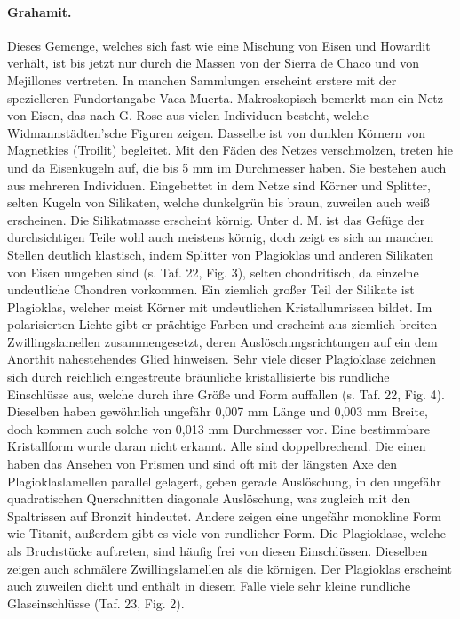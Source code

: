 \documentclass[a4paper, 12pt, oneside]{article}
\begin{document}
\paragraph{Grahamit.} Dieses Gemenge, welches sich fast wie eine Mischung von Eisen und Howardit verhält, ist bis jetzt nur durch die Massen von der Sierra de Chaco und von Mejillones vertreten. In manchen Sammlungen erscheint erstere mit der spezielleren Fundortangabe Vaca Muerta. Makroskopisch bemerkt man ein Netz von Eisen, das nach G. Rose aus vielen Individuen besteht, welche Widmannstädten'sche Figuren zeigen. Dasselbe ist von dunklen Körnern von Magnetkies (Troilit) begleitet. Mit den Fäden des Netzes verschmolzen, treten hie und da Eisenkugeln auf, die bis 5 mm im Durchmesser haben. Sie bestehen auch aus mehreren Individuen. Eingebettet in dem Netze sind Körner und Splitter, selten Kugeln von Silikaten, welche dunkelgrün bis braun, zuweilen auch weiß erscheinen. Die Silikatmasse erscheint körnig. Unter d. M. ist das Gefüge der durchsichtigen Teile wohl auch meistens körnig, doch zeigt es sich an manchen Stellen deutlich klastisch, indem Splitter von Plagioklas und anderen Silikaten von Eisen umgeben sind (s. Taf. 22, Fig. 3), selten chondritisch, da einzelne undeutliche Chondren vorkommen. Ein ziemlich großer Teil der Silikate ist Plagioklas, welcher meist Körner mit undeutlichen Kristallumrissen bildet. Im polarisierten Lichte gibt er prächtige Farben und erscheint aus ziemlich breiten Zwillingslamellen zusammengesetzt, deren Auslöschungsrichtungen auf ein dem Anorthit nahestehendes Glied hinweisen. Sehr viele dieser Plagioklase zeichnen sich durch reichlich eingestreute bräunliche kristallisierte bis rundliche Einschlüsse aus, welche durch ihre Größe und Form auffallen (s. Taf. 22, Fig. 4). Dieselben haben gewöhnlich ungefähr 0,007 mm Länge und 0,003 mm Breite, doch kommen auch solche von 0,013 mm Durchmesser vor. Eine bestimmbare Kristallform wurde daran nicht erkannt. Alle sind doppelbrechend. Die einen haben das Ansehen von Prismen und sind oft mit der längsten Axe den Plagioklaslamellen parallel gelagert, geben gerade Auslöschung, in den ungefähr quadratischen Querschnitten diagonale Auslöschung, was zugleich mit den Spaltrissen auf Bronzit hindeutet. Andere zeigen eine ungefähr monokline Form wie Titanit, außerdem gibt es viele von rundlicher Form. Die Plagioklase, welche als Bruchstücke auftreten, sind häufig frei von diesen Einschlüssen. Dieselben zeigen auch schmälere Zwillingslamellen als die körnigen. Der Plagioklas erscheint auch zuweilen dicht und enthält in diesem Falle viele sehr kleine rundliche Glaseinschlüsse (Taf. 23, Fig. 2).
\end{document}
